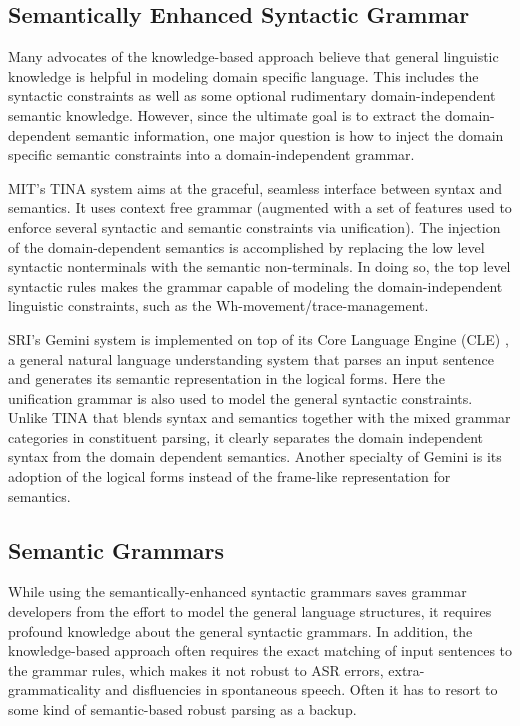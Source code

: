 \subsection{Semantically Enhanced Syntactic Grammar}
Many advocates of the knowledge-based approach believe that general linguistic knowledge
is helpful in modeling domain specific language. This includes the syntactic constraints
as well as some optional rudimentary domain-independent semantic knowledge. However,
since the ultimate goal is to extract the domain-dependent semantic information, one major
question is how to inject the domain specific semantic constraints into a domain-independent
grammar.

MIT’s TINA system \cite{d1e333} aims at the graceful, seamless interface between syntax
and semantics. It uses context free grammar (augmented with a set of features used to enforce several syntactic and semantic constraints via unification). The injection of the domain-dependent semantics is accomplished by replacing the low level syntactic nonterminals
with the semantic non-terminals. In doing so, the top level syntactic rules makes
the grammar capable of modeling the domain-independent linguistic constraints, such as
the Wh-movement/trace-management.

SRI’s Gemini system \cite{d1e149} is implemented on top of its Core Language
Engine (CLE) \cite{d1e35}, a general natural language understanding system that parses
an input sentence and generates its semantic representation in the logical forms. Here the
unification grammar is also used to model the general syntactic constraints. Unlike TINA
that blends syntax and semantics together with the mixed grammar categories in constituent
parsing, it clearly separates the domain independent syntax from the domain dependent
semantics. Another specialty of Gemini is its adoption of the logical forms instead of the
frame-like representation for semantics.

\subsection{Semantic Grammars}
While using the semantically-enhanced syntactic grammars saves grammar developers from
the effort to model the general language structures, it requires profound knowledge about the
general syntactic grammars. In addition, the knowledge-based approach often requires the
exact matching of input sentences to the grammar rules, which makes it not robust to ASR
errors, extra-grammaticality and disfluencies in spontaneous speech. Often it has to resort to
some kind of semantic-based robust parsing as a backup.

